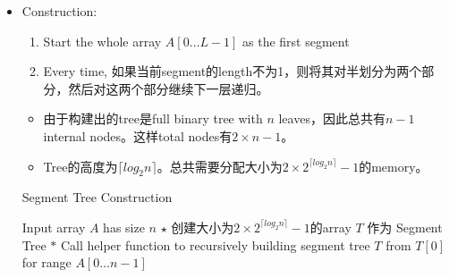 \begin{itemize}
\item Construction:
\begin{enumerate}
\item Start the whole array $A[0\ldots L-1]$ as the first segment
\item Every time, 如果当前segment的length不为1，则将其对半划分为两个部分，然后对这两个部分继续下一层递归。
\end{enumerate}
\begin{itemize}
\item 由于构建出的tree是full binary tree with $ n $ leaves，因此总共有$ n-1 $ internal nodes。这样total nodes有$ 2\times n -1 $。
\item Tree的高度为$ \lceil log_2{n}\rceil $。总共需要分配大小为$ 2\times 2^{\lceil log_2{n}\rceil}-1 $的memory。
\end{itemize}
\begin{algorithm}[H]
\caption{Segment Tree Construction}
\begin{algorithmic}[1]
 \Comment Input array $A$ has size $n$
\State $\star$ 创建大小为$ 2\times 2^{\lceil log_2{n}\rceil}-1 $的array $T$ 作为 Segment Tree
\State $\ast$ Call helper function to recursively building segment tree $T$ from $T[0]$ for range $A[0\ldots n-1]$
\State {} 
\EndProcedure
\end{algorithmic}
\end{algorithm}


\end{itemize}
